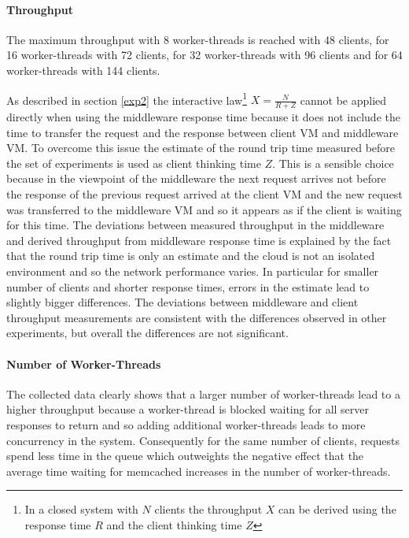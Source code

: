 \documentclass[report.tex]{subfiles}
\begin{document}
\paragraph{Throughput}
The maximum throughput with 8 worker-threads is reached with 48 clients, for 16 worker-threads with 72 clients, for 32 worker-threads with 96 clients and for 64 worker-threads with 144 clients.
 
As described in section \ref{exp2} the interactive law\footnote{In a closed system with $N$ clients the throughput $X$ can be derived using the response time $R$ and the client thinking time $Z$} $X = \frac{N}{R+Z}$ cannot be applied directly when using the middleware response time because it does not include the time to transfer the request and the response between client VM and middleware VM. To overcome this issue the estimate of the round trip time measured before the set of experiments is used as client thinking time $Z$. This is a sensible choice because in the viewpoint of the middleware the next request arrives not before the response of the previous request arrived at the client VM and the new request was transferred to the middleware VM and so it appears as if the client is waiting for this time.
The deviations between measured throughput in the middleware and derived throughput from middleware response time is explained by the fact that the round trip time is only an estimate and the cloud is not an isolated environment and so the network performance varies. In particular for smaller number of clients and shorter response times, errors in the estimate lead to slightly bigger differences.
The deviations between middleware and client throughput measurements are consistent with the differences observed in other experiments, but overall the differences are not significant.


\paragraph{Number of Worker-Threads}
The collected data clearly shows that a larger number of worker-threads lead to a higher throughput because a worker-thread is blocked waiting for all server responses to return and so adding additional worker-threads leads to more concurrency in the system. Consequently for the same number of clients, requests spend less time in the queue which outweights the negative effect that the average time waiting for memcached increases in the number of worker-threads.
\end{document}

